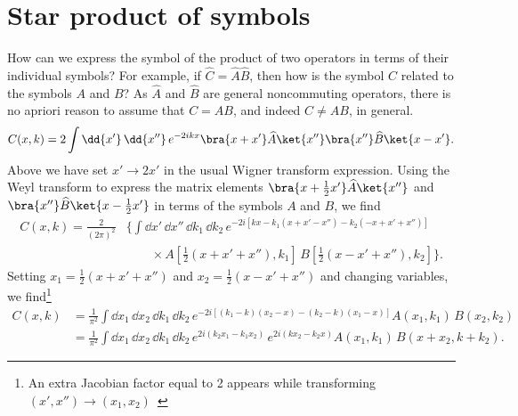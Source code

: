 \section{Star product of symbols}

How can we express the symbol of the product of two operators in terms of their individual symbols?
For example, if $\widehat{C} = \widehat{A}\widehat{B}$, then how is the symbol $C$ related to the symbols $A$ and $B$?
As $\widehat{A}$ and $\widehat{B}$ are general noncommuting operators, there is no apriori reason to assume that $C = AB$, and indeed $C \neq AB$, in general.
%
\begin{equation}
  C(x, k) = 2\int \dd{x'}\, \dd{x''} \,e^{-2ikx} \bra{x + x'}\widehat{A}\ket{x''}\bra{x''}\widehat{B}\ket{x - x'}.
\end{equation}
%
Above we have set $x' \to 2x'$ in the usual Wigner transform expression.
Using the Weyl transform to express the matrix elements $\bra{x + \tfrac{1}{2}x'}\widehat{A}\ket{x''}$ and $\bra{x''}\widehat{B}\ket{x - \tfrac{1}{2}x'}$ in terms of the symbols $A$ and $B$, we find
%
\begin{equation}
  \begin{aligned}
    C(x, k) = \frac{2}{(2\pi)^{2}}& \bigg\{\int \dd{x'}\, \dd{x''}\, \dd{k_{1}}\, \dd{k_{2}}\,e^{-2i[kx - k_{1}(x + x' - x'') - k_{2}(-x + x' + x'')]}\\
                                           &\qquad\times A\left[\tfrac{1}{2}(x + x' + x''), k_{1}\right]\, B\left[\tfrac{1}{2}(x - x' + x''), k_{2}\right]\bigg\}.
  \end{aligned}
\end{equation}
%
Setting $x_{1} = \tfrac{1}{2}(x + x' + x'')$ and $x_{2} = \tfrac{1}{2}(x - x' + x'')$ and changing variables, we find\footnote{An extra Jacobian factor equal to 2 appears while transforming $(x', x'') \to (x_{1}, x_{2})$~\cite[Eq.~(2.3.23) and Problem~2.3.8]{chaichian2001}}
%
\begin{equation}
  \begin{aligned}
    C(x, k) &= \frac{1}{\pi^{2}} \int \dd{x_{1}}\, \dd{x_{2}}\, \dd{k_{1}}\, \dd{k_{2}}\,e^{-2i[(k_{1} - k)(x_{2} - x) - (k_{2} - k)(x_{1} - x)]} A(x_{1}, k_{1})\, B(x_{2}, k_{2})\\
                     &= \frac{1}{\pi^{2}} \int \dd{x_{1}}\, \dd{x_{2}}\, \dd{k_{1}}\, \dd{k_{2}}\,e^{2i(k_{2}x_{1} - k_{1}x_{2})}\,e^{2i(kx_{2} - k_{2}x)} A(x_{1}, k_{1})\, B(x + x_{2}, k + k_{2}).\label{eq:moyal1}
  \end{aligned}
\end{equation}
